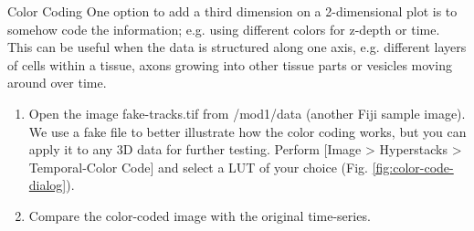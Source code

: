 \newpage
\begin{taskbox}{Color Coding}
One option to add a third dimension on a 2-dimensional plot is to somehow code the information; e.g. using different colors for z-depth or time. This can be useful when the data is structured along one axis, e.g. different layers of cells within a tissue, axons growing into other tissue parts or vesicles moving around over time.

\begin{enumerate}
	\item Open the image fake-tracks.tif from /mod1/data (another Fiji sample image). We use a fake file to better illustrate how the color coding works, but you can apply it to any 3D data for further testing. Perform [Image > Hyperstacks > Temporal-Color Code] and select a LUT of your choice (Fig. \ref{fig:color-code-dialog}).
	
	\begin{minipage}[t]{\linewidth}
		\begin{center}
		\medskip
		\label{fig:color-code-dialog}
		\end{center}
	\end{minipage}
	
	\item Compare the color-coded image with the original time-series.
\end{enumerate}

\end{taskbox}

